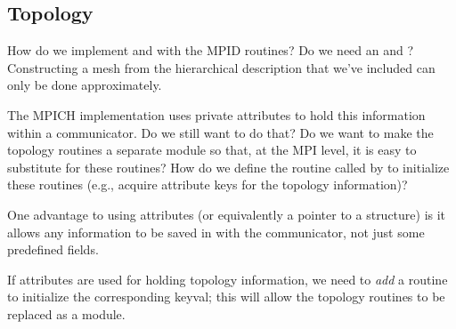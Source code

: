 \documentclass{article}
\begin{document}
\subsubsection{}
\subsubsection{}
\subsubsection{}
\subsubsection{}

\subsubsection{}
\subsubsection{}

\subsection{Topology}

How do we implement  and 
with the MPID routines?   
Do we need an  and
?  Constructing a mesh from the 
hierarchical description that we've included can only be done
approximately.

The MPICH implementation uses private attributes to hold this information 
within a communicator.  Do we still want to do that?  Do we want to make the
topology routines a separate module so that, at the MPI level, it is easy to
substitute for these routines?  How do we define the routine called by
 to initialize these routines (e.g., acquire attribute keys
for the topology information)?

One advantage to using attributes (or equivalently a pointer to a
structure) is it allows any information to be saved in with the
communicator, not just some predefined fields.  

If attributes are used for holding topology information, we need to
\emph{add} a routine to initialize the corresponding keyval; this will
allow the topology routines to be replaced as a module.
\end{document}
